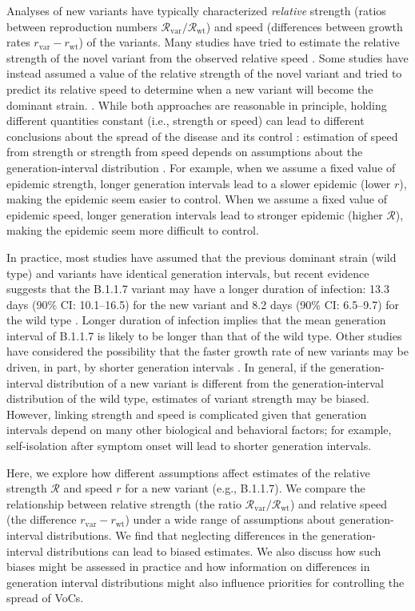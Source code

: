 \documentclass[12pt]{article}
\newcommand{\vvvar}{\mathrm{var}}
\newcommand{\wwwt}{\mathrm{wt}}
\newcommand{\rx}[1]{\ensuremath{{r}_{#1}}\xspace}
\newcommand{\rw}{\rx{\wwwt}}
\newcommand{\rv}{\rx{\vvvar}}
\newcommand{\Rx}[1]{\ensuremath{{\mathcal R}_{#1}}\xspace}
\newcommand{\RR}{\ensuremath{{\mathcal R}}\xspace}
\newcommand{\Rw}{\Rx{\wwwt}}
\newcommand{\Rv}{\Rx{\vvvar}}
\begin{document}
Analyses of new variants have typically characterized \emph{relative} strength (ratios between reproduction numbers $\Rv/\Rw$) and speed (differences between growth rates $\rv-\rw$) of the variants.
Many studies have tried to estimate the relative strength of the novel variant from the observed relative speed \citep{davies2021estimated, leung2021early, volz2021transmission,zhao2021}.
Some studies have instead assumed a value of the relative strength of the novel variant and tried to predict its relative speed to determine when a new variant will become the dominant strain. \citep{davies2021estimated,di2021impact}.
While both approaches are reasonable in principle, holding different quantities constant (i.e., strength or speed) can lead to different conclusions about the spread of the disease and its control \citep{doi:10.1098/rspb.2020.1556}:
estimation of speed from strength or strength from speed depends on assumptions about the generation-interval distribution \citep{roberts2007model,svensson2007note,wallinga2007generation}.
For example, when we assume a fixed value of epidemic strength, longer generation intervals lead to a slower epidemic (lower $r$), making the epidemic seem easier to control.
When we assume a fixed value of epidemic speed, longer generation intervals lead to stronger epidemic (higher $\RR$), making the epidemic seem more difficult to control.

In practice, most studies have assumed that the previous dominant strain (wild type) and variants have identical generation intervals, but recent evidence suggests that the B.1.1.7 variant may have a longer duration of infection: 13.3 days (90\% CI: 10.1--16.5) for the new variant and 8.2 days (90\% CI: 6.5--9.7) for the wild type \citep{kissler2021densely}.
Longer duration of infection implies that the mean generation interval of B.1.1.7 is likely to be longer than that of the wild type.
Other studies have considered the possibility that the faster growth rate of new variants may be driven, in part, by shorter generation intervals \citep{davies2021estimated,volz2021transmission}.
In general, if the generation-interval distribution of a new variant is different from the generation-interval distribution of the wild type, estimates of variant strength may be biased.
However, linking strength and speed is complicated given that generation intervals depend on many other biological and behavioral factors;
for example, self-isolation after symptom onset will lead to shorter generation intervals.

Here, we explore how different assumptions affect estimates of the relative strength $\RR$ and speed $r$ for a new variant (e.g., B.1.1.7).
We compare the relationship between relative strength (the ratio $\Rv/\Rw$) and relative speed (the difference $\rv-\rw$) under a wide range of assumptions about generation-interval distributions.
We find that neglecting differences in the generation-interval distributions can lead to biased estimates.
We also discuss how such biases might be assessed in practice and how information on differences in generation interval distributions might also influence priorities for controlling the spread of VoCs.
\end{document}
